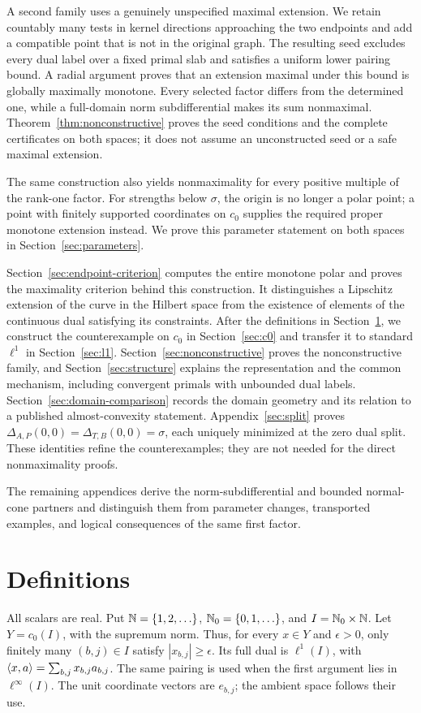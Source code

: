 A second family uses a genuinely unspecified maximal extension.
We retain countably many tests in kernel directions approaching the two endpoints
and add a compatible point that is not in the original graph. The resulting
seed excludes every dual label over a fixed primal slab and satisfies a
uniform lower pairing bound. A radial argument proves that an extension
maximal under this bound is globally maximally monotone. Every selected
factor differs from the determined one, while a full-domain norm
subdifferential makes its sum nonmaximal. Theorem~\ref{thm:nonconstructive}
proves the seed conditions and the complete certificates on both spaces;
it does not assume an unconstructed seed or a safe maximal extension.

The same construction also yields nonmaximality for every positive
multiple of the rank-one factor. For strengths below $\sigma$, the origin
is no longer a polar point; a point with finitely supported coordinates on $c_0$ supplies the required
proper monotone extension instead. We prove this parameter statement
on both spaces in Section~\ref{sec:parameters}.

Section~\ref{sec:endpoint-criterion} computes the entire monotone polar
and proves the maximality criterion behind this construction. It distinguishes a Lipschitz
extension of the curve in the Hilbert space from the existence of elements
of the continuous dual satisfying its constraints.
After the definitions in Section~\ref{sec:definitions}, we construct the
counterexample on $c_0$ in Section~\ref{sec:c0} and transfer it to standard
$\ell^1$ in Section~\ref{sec:l1}.
Section~\ref{sec:nonconstructive} proves the nonconstructive family,
and Section~\ref{sec:structure} explains the representation and the
common mechanism, including convergent primals with unbounded dual labels.
Section~\ref{sec:domain-comparison} records the domain geometry and its
relation to a published almost-convexity statement.
Appendix~\ref{sec:split} proves
$\Delta_{A,P}(0,0)=\Delta_{T,B}(0,0)=\sigma$, each uniquely minimized
at the zero dual split. These identities refine the counterexamples;
they are not needed for the direct nonmaximality proofs.

The remaining appendices derive the norm-subdifferential and bounded
normal-cone partners and distinguish them from parameter changes,
transported examples, and logical consequences of the same first factor.



\section{Definitions}
\label{sec:definitions}
All scalars are real. Put $\mathbb N=\{1,2,\ldots\}$, $\mathbb N_0=\{0,1,\ldots\}$,
and $I=\mathbb N_0\times\mathbb N$. Let $Y=c_0(I)$, with the supremum norm. Thus,
for every $x\in Y$ and $\epsilon>0$, only finitely many $(b,j)\in I$
satisfy $|x_{b,j}|\ge\epsilon$. Its full dual is $\ell^1(I)$,
with $\langle x,a\rangle=\sum_{b,j}x_{b,j}a_{b,j}$.
The same pairing is used when the first argument lies in $\ell^\infty(I)$.
The unit coordinate vectors are $e_{b,j}$; the ambient space follows their use.

